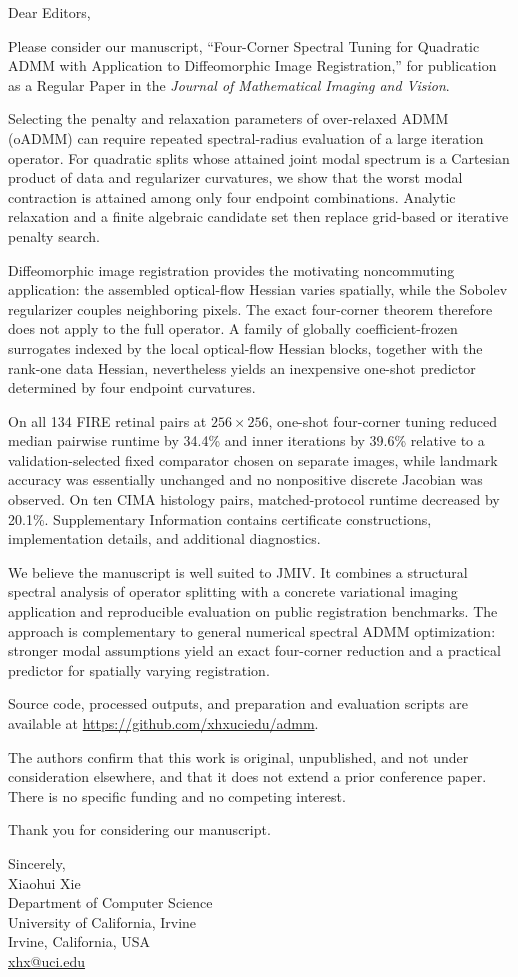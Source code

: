 \documentclass[11pt]{letter}
\begin{document}
Dear Editors,

Please consider our manuscript, ``Four-Corner Spectral Tuning for Quadratic ADMM with Application to Diffeomorphic Image Registration,'' for publication as a Regular Paper in the \emph{Journal of Mathematical Imaging and Vision}.

Selecting the penalty and relaxation parameters of over-relaxed ADMM (oADMM) can require repeated spectral-radius evaluation of a large iteration operator. For quadratic splits whose attained joint modal spectrum is a Cartesian product of data and regularizer curvatures, we show that the worst modal contraction is attained among only four endpoint combinations. Analytic relaxation and a finite algebraic candidate set then replace grid-based or iterative penalty search.

Diffeomorphic image registration provides the motivating noncommuting application: the assembled optical-flow Hessian varies spatially, while the Sobolev regularizer couples neighboring pixels. The exact four-corner theorem therefore does not apply to the full operator. A family of globally coefficient-frozen surrogates indexed by the local optical-flow Hessian blocks, together with the rank-one data Hessian, nevertheless yields an inexpensive one-shot predictor determined by four endpoint curvatures.

On all 134 FIRE retinal pairs at $256\times256$, one-shot four-corner tuning reduced median pairwise runtime by 34.4\% and inner iterations by 39.6\% relative to a validation-selected fixed comparator chosen on separate images, while landmark accuracy was essentially unchanged and no nonpositive discrete Jacobian was observed. On ten CIMA histology pairs, matched-protocol runtime decreased by 20.1\%. Supplementary Information contains certificate constructions, implementation details, and additional diagnostics.

We believe the manuscript is well suited to JMIV. It combines a structural spectral analysis of operator splitting with a concrete variational imaging application and reproducible evaluation on public registration benchmarks. The approach is complementary to general numerical spectral ADMM optimization: stronger modal assumptions yield an exact four-corner reduction and a practical predictor for spatially varying registration.

Source code, processed outputs, and preparation and evaluation scripts are available at \url{https://github.com/xhxuciedu/admm}.

The authors confirm that this work is original, unpublished, and not under consideration elsewhere, and that it does not extend a prior conference paper. There is no specific funding and no competing interest.

Thank you for considering our manuscript.

Sincerely,\\[1.25em]
Xiaohui Xie\\
Department of Computer Science\\
University of California, Irvine\\
Irvine, California, USA\\
\href{mailto:xhx@uci.edu}{xhx@uci.edu}
\end{document}

